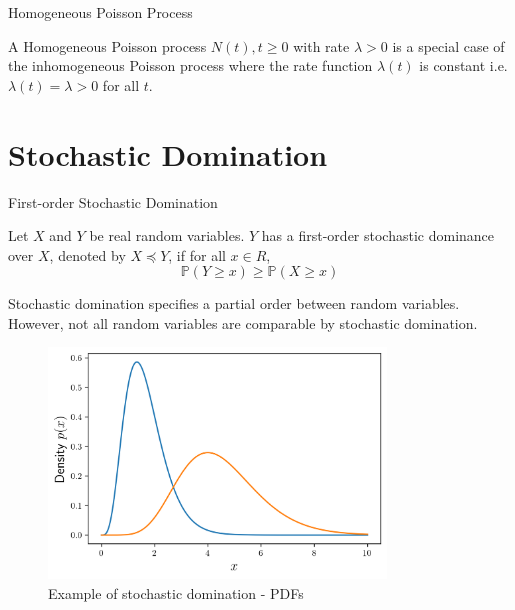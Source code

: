 \begin{definition}
	Homogeneous Poisson Process

	\noindent
	A Homogeneous Poisson process ${N(t), t \geq 0}$ with rate $\lambda > 0$ is a special case of the inhomogeneous Poisson process where the rate function $\lambda(t)$ is constant i.e. $\lambda(t)=\lambda > 0$ for all $t$.
\end{definition}


\section{Stochastic Domination}


\begin{definition}
	First-order Stochastic Domination

	\noindent
	Let $X$ and $Y$ be real random variables. $Y$ has a first-order stochastic dominance over $X$, denoted by $X \preceq Y$, if for all $x \in R$, 
	$$
		\mathbb{P}(Y \geq x) \geq \mathbb{P}(X \geq x)
	$$
\end{definition}

Stochastic domination specifies a partial order between random variables. However, not all random variables are comparable by stochastic domination. %


\begin{figure}[h]
	\centering
	\includegraphics[width=0.8\textwidth]{./figures/stochastic_domination_pdf.png}
	\caption{Example of stochastic domination - PDFs}
	\label{fig:stochDomPDFs}
\end{figure}


